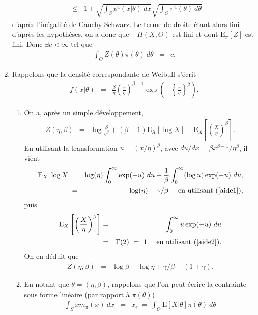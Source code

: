 \documentclass[10pt]{article}
\newcommand{\E}{\mbox{E}}
\newcommand{\1}{\mathbbm{1}}
\begin{document}
\begin{enumerate}
\begin{eqnarray*}
& \leq & 1 + \sqrt{\int_S p^4(x|\theta) \ dx}\sqrt{\int_{\Theta} \pi^4(\theta) \ d\theta}
\end{eqnarray*}
d'après l'inégalité de  Cauchy-Schwarz. Le terme de droite étant alors fini d'après les hypothèses, on a donc que $-H(X,\Theta)$ est fini et dont $\E_{\pi}[Z] $ est fini. Donc $\exists c<\infty$ tel que 
\begin{eqnarray*}
\int_{\Theta} Z(\theta) \pi(\theta) \ d\theta & = & c.
\end{eqnarray*}
\item Rappelons que la densité correspondante de Weibull s'écrit
\begin{eqnarray*}
f(x|\theta) & = & \frac{\beta}{\eta} \left(\frac{x}{\eta}\right)^{\beta-1} \exp\left(-\left\{\frac{x}{\eta}\right\}^{\beta}\right).
\end{eqnarray*}
\begin{enumerate}
\item On a, après un simple développement,
\begin{eqnarray*}
Z(\eta,\beta) & = & \log \frac{\beta}{\eta^{\beta}} + (\beta-1) \E_X\left[\log X\right] -  \E_X\left[\left(\frac{X}{\eta}\right)^{\beta}\right]. 
\end{eqnarray*}
En utilisant la transformation $u=(x/\eta)^{\beta}$, avec $du/dx = \beta x^{\beta-1}/\eta^{\beta}$, il vient
\begin{eqnarray*}
\E_X\left[\log X\right] & = & \log(\eta) \int_{0}^{\infty} \exp(-u) \ du + \frac{1}{\beta} \int_{0}^{\infty} (\log u)  \exp(-u) \ du, \\
& = &  \log(\eta) - \gamma/\beta \ \ \ \ \text{en utilisant (\ref{aide1})},
\end{eqnarray*}
puis
\begin{eqnarray*}
\E_X\left[\left(\frac{X}{\eta}\right)^{\beta}\right] & = &  \int_{0}^{\infty} u \exp(-u) \ du  \\
& = &  \Gamma(2) \ = \ 1 \ \ \ \ \text{en utilisant (\ref{aide2})}.
\end{eqnarray*}
On en déduit que
\begin{eqnarray*}
Z(\eta,\beta) & = & \log \beta - \log \eta + \gamma/\beta - (1+\gamma). 
\end{eqnarray*}
\item En notant que $\theta=(\eta,\beta)$, rappelons que l'on peut écrire la contrainte sous forme linéaire (par rapport à $\pi(\theta)$)
\begin{eqnarray}
\int_S x m_{\pi}(x) \ dx & = & x_e \ = \ \int_{\Theta} \E[X|\theta] \pi(\theta)  \ d\theta \label{mean1}

\end{eqnarray}
\end{enumerate}
\end{enumerate}
\end{document}
